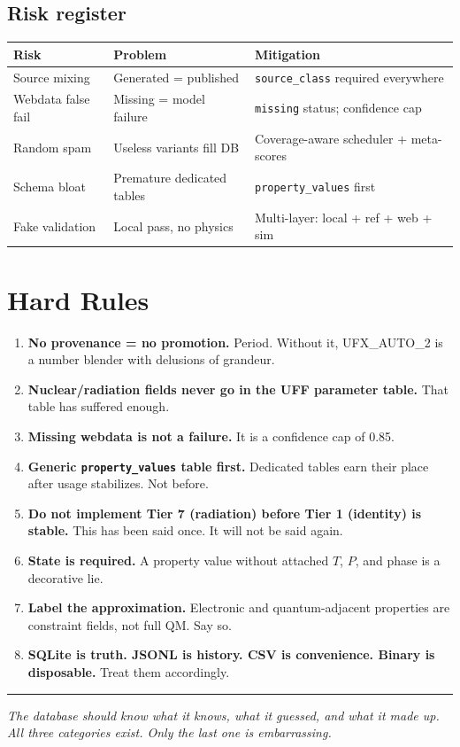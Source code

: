 \documentclass[11pt, a4paper]{article}
\begin{document}
\subsection{Risk register}

\begin{center}
\begin{tabular}{lll}
\toprule
\textbf{Risk} & \textbf{Problem} & \textbf{Mitigation} \\
\midrule
Source mixing     & Generated = published        & \texttt{source\_class} required everywhere \\
Webdata false fail & Missing = model failure     & \texttt{missing} status; confidence cap \\
Random spam       & Useless variants fill DB     & Coverage-aware scheduler + meta-scores \\
Schema bloat      & Premature dedicated tables   & \texttt{property\_values} first \\
Fake validation   & Local pass, no physics       & Multi-layer: local + ref + web + sim \\
\bottomrule
\end{tabular}
\end{center}

\section{Hard Rules}

\begin{rulebox}
\begin{enumerate}[leftmargin=*, itemsep=6pt]
  \item \textbf{No provenance = no promotion.} Period. Without it, UFX\_AUTO\_2 is a number blender with delusions of grandeur.
  \item \textbf{Nuclear/radiation fields never go in the UFF parameter table.} That table has suffered enough.
  \item \textbf{Missing webdata is not a failure.} It is a confidence cap of 0.85.
  \item \textbf{Generic \texttt{property\_values} table first.} Dedicated tables earn their place after usage stabilizes. Not before.
  \item \textbf{Do not implement Tier 7 (radiation) before Tier 1 (identity) is stable.} This has been said once. It will not be said again.
  \item \textbf{State is required.} A property value without attached $T$, $P$, and phase is a decorative lie.
  \item \textbf{Label the approximation.} Electronic and quantum-adjacent properties are constraint fields, not full QM. Say so.
  \item \textbf{SQLite is truth. JSONL is history. CSV is convenience. Binary is disposable.} Treat them accordingly.
\end{enumerate}
\end{rulebox}

\vspace{10pt}
\hrule
\vspace{8pt}

\begin{center}
\textit{The database should know what it knows, what it guessed, and what it made up.\\
All three categories exist. Only the last one is embarrassing.}
\end{center}
\end{document}
